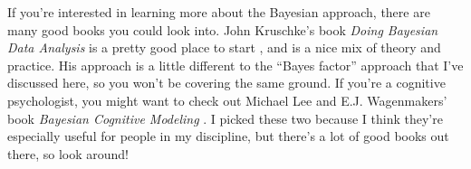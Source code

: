 If you're interested in learning more about the Bayesian approach, there are many good books you could look into. John Kruschke's book {\it Doing Bayesian Data Analysis} is a pretty good place to start \cite{Kruschke2011}, and is a nice mix of theory and practice. His approach is a little different to the ``Bayes factor'' approach that I've discussed here, so you won't be covering the same ground. If you're a cognitive psychologist, you might want to check out Michael Lee and E.J. Wagenmakers' book {\it Bayesian Cognitive Modeling} \cite{Lee2014}. I picked these two because I think they're especially useful for people in my discipline, but there's a lot of good books out there, so look around!




